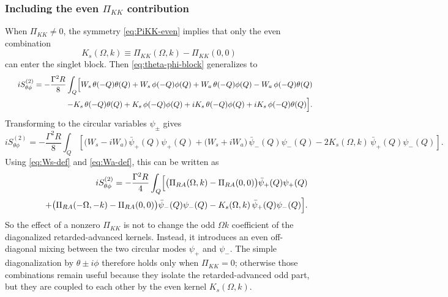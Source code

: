 \documentclass[aps,prx,preprint,amsmath,amssymb]{revtex4-2}
\begin{document}
\subsubsection{Including the even \(\Pi_{KK}\) contribution}

When \(\Pi_{KK}\neq 0\), the symmetry \eqref{eq:PiKK-even} implies that only the
even combination
\begin{equation}
K_s(\Omega,k)\equiv \Pi_{KK}(\Omega,k)-\Pi_{KK}(0,0)
\end{equation}
can enter the singlet block.  Then \eqref{eq:theta-phi-block} generalizes to
\begin{equation}
\begin{split}
iS^{(2)}_{\theta\phi}
=
-\frac{\Gamma^2R}{8}\int_Q
\Bigl[
W_s\,\theta(-Q)\theta(Q)
+W_s\,\phi(-Q)\phi(Q)
+W_a\,\theta(-Q)\phi(Q)
-W_a\,\phi(-Q)\theta(Q)
\\
\qquad\qquad\qquad\qquad
-K_s\,\theta(-Q)\theta(Q)
+K_s\,\phi(-Q)\phi(Q)
+iK_s\,\theta(-Q)\phi(Q)
+iK_s\,\phi(-Q)\theta(Q)
\Bigr].
\end{split}
\end{equation}
Transforming to the circular variables \(\psi_\pm\) gives
\begin{equation}\label{eq:theta-phi-with-KK}
iS^{(2)}_{\theta\phi}
=
-\frac{\Gamma^2R}{8}\int_Q
\left[
\bigl(W_s-iW_a\bigr)\,\bar\psi_+(Q)\psi_+(Q)
+\bigl(W_s+iW_a\bigr)\,\bar\psi_-(Q)\psi_-(Q)
-2K_s(\Omega,k)\,\bar\psi_+(Q)\psi_-(Q)
\right].
\end{equation}
Using \eqref{eq:Ws-def} and \eqref{eq:Wa-def}, this can be written as
\begin{equation}
\begin{split}
iS^{(2)}_{\theta\phi}
=
-\frac{\Gamma^2R}{4}\int_Q
\Bigl[
\bigl(\Pi_{RA}(\Omega,k)-\Pi_{RA}(0,0)\bigr)\bar\psi_+(Q)\psi_+(Q)
\\
\qquad\qquad
+\bigl(\Pi_{RA}(-\Omega,-k)-\Pi_{RA}(0,0)\bigr)\bar\psi_-(Q)\psi_-(Q)
-K_s(\Omega,k)\,\bar\psi_+(Q)\psi_-(Q)
\Bigr].
\end{split}
\end{equation}
So the effect of a nonzero \(\Pi_{KK}\) is not to change the odd
\(\Omega k\) coefficient of the diagonalized retarded-advanced kernels.  Instead,
it introduces an even off-diagonal mixing between the two circular modes
\(\psi_+\) and \(\psi_-\).  The simple diagonalization by \(\theta\pm i\phi\)
therefore holds only when \(\Pi_{KK}=0\); otherwise those combinations remain
useful because they isolate the retarded-advanced odd part, but they are coupled
to each other by the even kernel \(K_s(\Omega,k)\).
\end{document}
